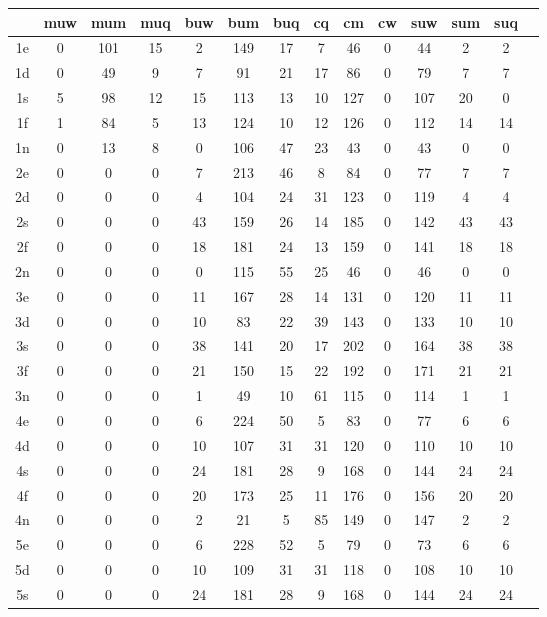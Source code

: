 \documentclass[a4paper,11pt]{article}
\begin{document}
	\begin{figure}[h]
		\begin{tabular}{c|c|c|c|c|c|c|c|c|c|c|c|c|c}
			& muw & mum & muq & buw & bum & buq & cq & cm & cw & suw & sum & suq \\
			\hline
			1e & 0 & 101 & 15 & 2 & 149 & 17 & 7 & 46 & 0 & 44 & 2 & 2 \\
			1d & 0 & 49 & 9 & 7 & 91 & 21 & 17 & 86 & 0 & 79 & 7 & 7 \\ 
			1s & 5 & 98 & 12 & 15 & 113 & 13 & 10 & 127 & 0 & 107 & 20 & 0\\
			1f & 1 & 84 & 5 & 13 & 124 & 10 & 12 & 126 & 0 & 112 & 14 & 14 \\
			1n & 0 & 13 & 8 & 0 & 106 & 47 & 23 & 43& 0 & 43 & 0 & 0 \\
			2e & 0 & 0 & 0 & 7 & 213 & 46 & 8 & 84 & 0 & 77 & 7 & 7 \\
			2d & 0 & 0 & 0 & 4 & 104 & 24 & 31 & 123 & 0 & 119 & 4 & 4 \\
			2s & 0 & 0 & 0 & 43 & 159 & 26 & 14 & 185 & 0 & 142 & 43 & 43\\
			2f & 0 & 0 & 0 & 18 & 181 & 24 & 13 & 159 & 0 & 141 & 18 & 18\\
			2n & 0 & 0 & 0 & 0 & 115 & 55 & 25 & 46 & 0 & 46 & 0 & 0 \\
			3e & 0 & 0 & 0 & 11 & 167 & 28 & 14 & 131 & 0 & 120 & 11 & 11\\
			3d & 0 & 0 & 0 & 10 & 83 & 22 & 39 & 143 & 0 & 133 & 10 & 10 \\
			3s & 0 & 0 & 0 & 38 & 141 & 20 & 17 & 202 & 0 & 164 & 38 & 38 \\
			3f & 0 & 0 & 0 & 21 & 150 & 15 & 22 & 192 & 0 & 171 & 21 & 21 \\
			3n & 0 & 0 & 0 & 1 & 49 & 10 & 61 & 115 & 0 & 114 & 1 & 1 \\
			4e & 0 & 0 & 0 & 6 & 224 & 50 & 5 & 83 & 0 & 77 & 6 & 6 \\
			4d & 0 & 0 & 0 & 10 & 107 & 31 & 31 & 120 & 0 & 110 & 10 & 10 \\
			4s & 0 & 0 & 0 & 24 & 181 & 28 & 9 & 168 & 0 & 144 & 24 & 24 \\
			4f & 0 & 0 & 0 & 20 & 173 & 25 & 11 & 176 & 0 & 156 & 20 & 20 \\
			4n & 0 & 0 & 0 & 2 & 21 & 5 & 85 & 149 & 0 & 147 & 2 & 2 \\
			5e & 0 & 0 & 0 & 6 & 228 & 52 & 5 & 79 & 0 & 73 & 6 & 6 \\
			5d & 0 & 0 & 0 & 10 & 109 & 31 & 31 & 118 & 0 & 108 & 10 & 10 \\
			5s & 0 & 0 & 0 & 24 & 181 & 28 & 9 & 168 & 0 & 144 & 24 & 24 \\

\end{tabular}
\end{figure}
\end{document}
